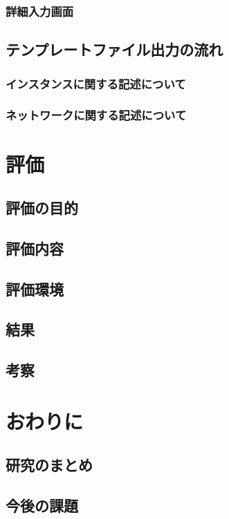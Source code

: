 \documentclass[mingoth]{kut-paper}		%
\begin{document}
		\subsection{詳細入力画面}
	
	\section{テンプレートファイル出力の流れ}
		\subsection{インスタンスに関する記述について}
		
		\subsection{ネットワークに関する記述について}
		
\chapter{評価}
	\section{評価の目的}
	
	\section{評価内容}
	
	\section{評価環境}
	
	\section{結果}
	
	\section{考察}
	
\chapter{おわりに}
	\section{研究のまとめ}
	\section{今後の課題}
	
\end{document}
